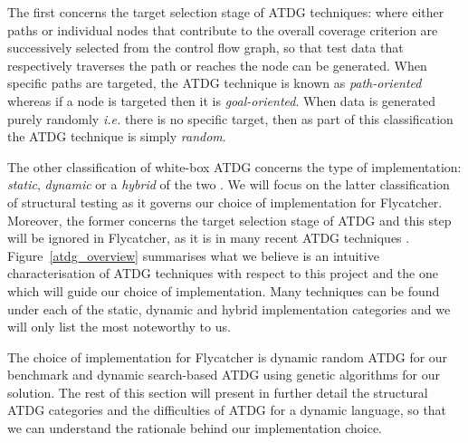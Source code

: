 The first concerns the target selection stage of ATDG techniques: where either paths or individual nodes that contribute to the overall coverage criterion are successively selected from the control flow graph, so that test data that respectively traverses the path or reaches the node can be generated. When specific paths are targeted, the ATDG technique is known as \emph{path-oriented} \cite{edvardsson1999survey} whereas if a node is targeted then it is \emph{goal-oriented}. When data is generated purely randomly \emph{i.e.} there is no specific target, then as part of this classification the ATDG technique is simply \emph{random}.

The other classification of white-box ATDG concerns the type of implementation: \emph{static}, \emph{dynamic} or a \emph{hybrid} of the two \cite{han2008empirical, mcminn2004search}. We will focus on the latter classification of structural testing as it governs our choice of implementation for \textsf{Flycatcher}. Moreover, the former concerns the target selection stage of ATDG and this step will be ignored in \textsf{Flycatcher}, as it is in many recent ATDG techniques \cite{tahbildar2automated}. Figure~\ref{atdg_overview} summarises what we believe is an intuitive characterisation of ATDG techniques with respect to this project and the one which will guide our choice of implementation. Many techniques can be found under each of the static, dynamic and hybrid implementation categories and we will only list the most noteworthy to us.

The choice of implementation for \textsf{Flycatcher} is dynamic random ATDG for our benchmark and dynamic search-based ATDG using genetic algorithms for our solution. The rest of this section will present in further detail the structural ATDG categories and the difficulties of ATDG for a dynamic language, so that we can understand the rationale behind our implementation choice.


